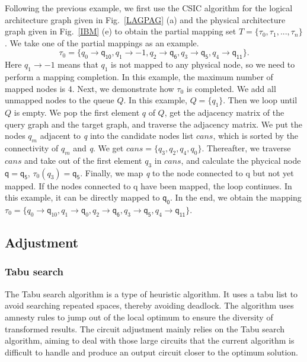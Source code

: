 \documentclass[runningheads]{llncs}
\begin{document}
\begin{example}
	Following the previous example, we first use the CSIC algorithm for the logical architecture graph given in Fig.~\ref{LAGPAG} (a) and the physical architecture graph given in Fig.~\ref{IBM} (e) to obtain the partial mapping set $T=\{\tau_{0},\tau_{1},...,\tau_{n}\}$. We take one of the partial mappings as an example.
	$$\tau_{0}=\{\textit{q}_\textit{0}\rightarrow \textsf{q}_{\textsf{10}},\textit{q}_\textit{1}\rightarrow -1,
	\textit{q}_\textit{2}\rightarrow \textsf{q}_{\textsf{6}},\textit{q}_\textit{3}\rightarrow \textsf{q}_{\textsf{5}},\textit{q}_\textit{4}\rightarrow \textsf{q}_{\textsf{11}}\}. $$ 
Here $\textit{q}_\textit{1}\rightarrow -1$ means that $\textit{q}_\textit{1}$ is not mapped to any physical node, so we need to perform a mapping completion. In this example, the maximum number of mapped nodes is 4. Next, we demonstrate how $\tau_{0}$ is completed. We add all unmapped nodes to the queue $Q$. In this example, $Q=\{\textit{q}_\textit{1}\}$. Then we loop until $Q$ is empty. We pop the first element $q$ of $Q$, get the adjacency matrix of the query graph and the target graph, and traverse the adjacency matrix. We put the nodes  $\textit{q}_\textit{m}$ adjacent to \textit{q} into the candidate nodes list $cans$, which is sorted by the connectivity of $\textit{q}_\textit{m}$ and \textit{q}. We get $cans=\{\textit{q}_\textit{3},\textit{q}_\textit{2},\textit{q}_\textit{4},\textit{q}_\textit{0}\}$. Thereafter, we traverse $cans$ and take out of the first element $\textit{q}_\textit{3}$ in $cans$, and calculate the phycical node $\textsf{q}=\textsf{q}_{\textsf{5}}$, $\tau_0(\textit{q}_\textit{3})=\textsf{q}_{\textsf{5}}$. Finally, we map \textit{q} to the node connected to \textsf{q} but not yet mapped. If the nodes connected to \textsf{q} have been mapped, the loop continues. In this example, it can be directly mapped to $\textsf{q}_{\textsf{0}}$. In the end, we obtain the mapping $ \tau_{0}=\{\textit{q}_\textit{0}\rightarrow  \textsf{q}_{10},\textit{q}_\textit{1}\rightarrow \textsf{q}_{0},	\textit{q}_\textit{2}\rightarrow  \textsf{q}_{\textsf{6}},\textit{q}_\textit{3}\rightarrow  \textsf{q}_{\textsf{5}},\textit{q}_\textit{4}\rightarrow  \textsf{q}_{\textsf{11}}\}. $
	\end{example}
\subsection{Adjustment}
\subsubsection{Tabu search}
The Tabu search algorithm is a type of heuristic algorithm. It uses a tabu list to avoid searching repeated spaces, thereby avoiding deadlock. The algorithm uses amnesty rules to jump out of the local optimum to ensure the diversity of transformed results. The circuit adjustment mainly relies on the Tabu search algorithm, aiming to deal with those large circuits that the current algorithm is difficult to handle and produce an output circuit closer to the optimum solution.
\end{document}
